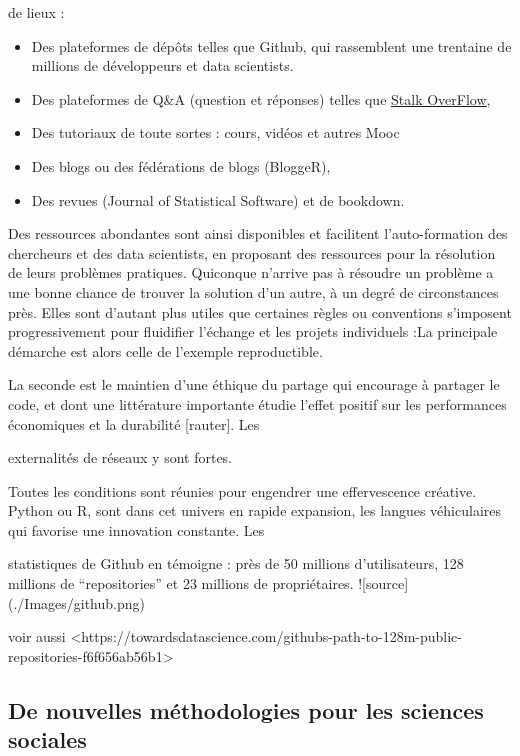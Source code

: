 \documentclass[
  letterpaper,
  DIV=11,
  numbers=noendperiod]{scrreprt}
\begin{document}
de lieux :

\begin{itemize}
\item
  Des plateformes de dépôts telles que Github, qui rassemblent une
  trentaine de millions de développeurs et data scientists.
\item
  Des plateformes de Q\&A (question et réponses) telles que
  \href{}{Stalk OverFlow},
\item
  Des tutoriaux de toute sortes : cours, vidéos et autres Mooc
\item
  Des blogs ou des fédérations de blogs (BloggeR),
\item
  Des revues (Journal of Statistical Software) et de bookdown.
\end{itemize}

Des ressources abondantes sont ainsi disponibles et facilitent
l'auto-formation des chercheurs et des data scientists, en proposant des
ressources pour la résolution de leurs problèmes pratiques. Quiconque
n'arrive pas à résoudre un problème a une bonne chance de trouver la
solution d'un autre, à un degré de circonstances près. Elles sont
d'autant plus utiles que certaines règles ou conventions s'imposent
progressivement pour fluidifier l'échange et les projets individuels :La
principale démarche est alors celle de l'exemple reproductible.

La seconde est le maintien d'une éthique du partage qui encourage à
partager le code, et dont une littérature importante étudie l'effet
positif sur les performances économiques et la durabilité {[}rauter{]}.
Les

externalités de réseaux y sont fortes.

Toutes les conditions sont réunies pour engendrer une effervescence
créative. Python ou R, sont dans cet univers en rapide expansion, les
langues véhiculaires qui favorise une innovation constante. Les

statistiques de Github en témoigne : près de 50 millions d'utilisateurs,
128 millions de ``repositories'' et 23 millions de propriétaires.
!{[}source{]}(./Images/github.png)

voir aussi
\textless https://towardsdatascience.com/githubs-path-to-128m-public-repositories-f6f656ab56b1\textgreater{}

\subsection{De nouvelles méthodologies pour les sciences
sociales}\label{de-nouvelles-muxe9thodologies-pour-les-sciences-sociales}
\end{document}
